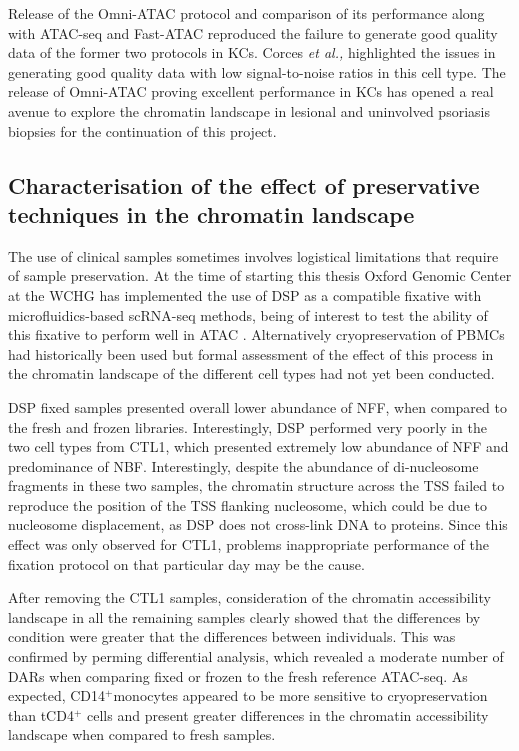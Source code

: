 Release of the Omni-ATAC protocol and comparison of its performance along with ATAC-seq and Fast-ATAC reproduced the failure to generate good quality data of the former two protocols in KCs. Corces \textit{et al.,} highlighted the issues in generating  good quality data with low signal-to-noise ratios in this cell type. The release of Omni-ATAC proving excellent performance in KCs has opened a real avenue to explore the chromatin landscape in lesional and uninvolved psoriasis biopsies for the continuation of this project.


\subsection{Characterisation of the effect of preservative techniques in the chromatin landscape}
The use of clinical samples sometimes involves logistical limitations that require of sample preservation. At the time of starting this thesis Oxford Genomic Center at the WCHG has implemented the use of DSP as a compatible fixative with microfluidics-based scRNA-seq methods, being of interest to test the ability of this fixative to perform well in ATAC \parencite{Attar2018}. Alternatively cryopreservation of PBMCs had historically been used but formal assessment of the effect of this process in the chromatin landscape of the different cell types had not yet been conducted.

DSP fixed samples presented overall lower abundance of NFF, when compared to the fresh and frozen libraries. Interestingly, DSP performed very poorly in the two cell types from CTL1, which presented extremely low abundance of NFF and predominance of NBF. Interestingly, despite the abundance of di-nucleosome fragments in these two samples, the chromatin structure across the TSS failed to reproduce the position of the TSS flanking nucleosome, which could be due to nucleosome displacement, as DSP does not cross-link DNA to proteins. Since this effect was only observed for CTL1, problems inappropriate performance of the fixation protocol on that particular day may be the cause.

After removing the CTL1 samples, consideration of the chromatin accessibility landscape in all the remaining samples clearly showed that the differences by condition were greater that the differences between individuals. This was confirmed by perming differential analysis, which revealed a moderate number of DARs when comparing fixed or frozen to the fresh reference ATAC-seq. As expected, CD14$^+$monocytes appeared to be more sensitive to cryopreservation than tCD4$^+$ cells and present greater differences in the chromatin accessibility landscape when compared to fresh samples.

